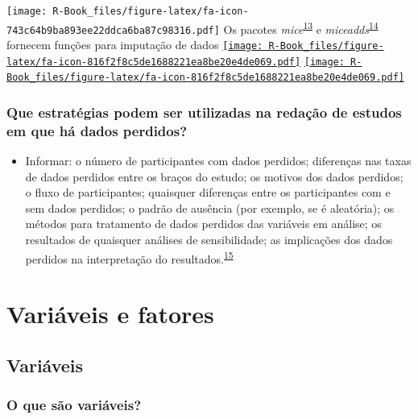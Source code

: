 \documentclass[
]{book}
\providecommand{\tightlist}{%
  \setlength{\itemsep}{0pt}\setlength{\parskip}{0pt}}
\begin{document}
\texttt{[image: R-Book\_files/figure-latex/fa-icon-743c64b9ba893ee22ddca6ba87c98316.pdf]} Os pacotes \emph{mice}\textsuperscript{\protect\hyperlink{ref-mice}{13}} e \emph{miceadds}\textsuperscript{\protect\hyperlink{ref-miceadds}{14}} fornecem funções para imputação de dados \href{https://cran.r-project.org/web/packages/mice/index.html}{\texttt{[image: R-Book\_files/figure-latex/fa-icon-816f2f8c5de1688221ea8be20e4de069.pdf]}} \href{https://cran.r-project.org/web/packages/miceadds/index.html}{\texttt{[image: R-Book\_files/figure-latex/fa-icon-816f2f8c5de1688221ea8be20e4de069.pdf]}}

\hypertarget{que-estratuxe9gias-podem-ser-utilizadas-na-redauxe7uxe3o-de-estudos-em-que-huxe1-dados-perdidos}{%
\subsection{Que estratégias podem ser utilizadas na redação de estudos em que há dados perdidos?}\label{que-estratuxe9gias-podem-ser-utilizadas-na-redauxe7uxe3o-de-estudos-em-que-huxe1-dados-perdidos}}

\begin{itemize}
\tightlist
\item
  Informar: o número de participantes com dados perdidos; diferenças nas taxas de dados perdidos entre os braços do estudo; os motivos dos dados perdidos; o fluxo de participantes; quaisquer diferenças entre os participantes com e sem dados perdidos; o padrão de ausência (por exemplo, se é aleatória); os métodos para tratamento de dados perdidos das variáveis em análise; os resultados de quaisquer análises de sensibilidade; as implicações dos dados perdidos na interpretação do resultados.\textsuperscript{\protect\hyperlink{ref-Akl2015}{15}}
\end{itemize}

\hypertarget{variaveis-fatores}{%
\chapter{\texorpdfstring{\textbf{Variáveis e fatores}}{Variáveis e fatores}}\label{variaveis-fatores}}

\hypertarget{variaveis}{%
\section{Variáveis}\label{variaveis}}

\hypertarget{o-que-suxe3o-variuxe1veis}{%
\subsection{O que são variáveis?}\label{o-que-suxe3o-variuxe1veis}}
\end{document}
